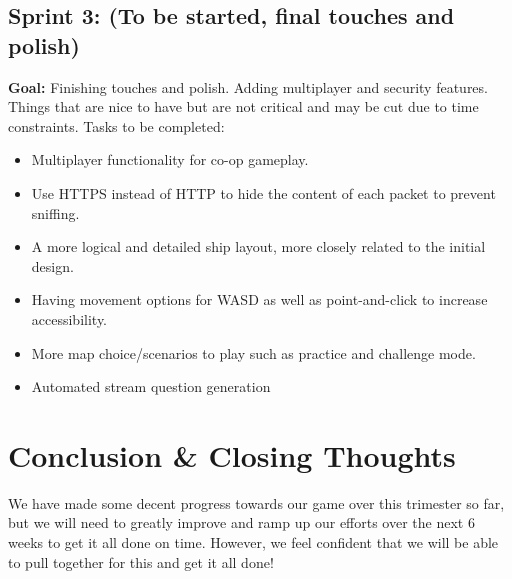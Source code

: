 \documentclass{article}
\begin{document}
\subsection*{Sprint 3: (To be started, final touches and polish)}
\textbf{Goal:} Finishing touches and polish. Adding  multiplayer and security features. Things that are nice to have but are not critical and may be cut due to time constraints.
\newline\newline
Tasks to be completed:
\begin{itemize}
    \item Multiplayer functionality for co-op gameplay.
    \item Use HTTPS instead of HTTP to hide the content of each packet to prevent sniffing.
    \item A more logical and detailed ship layout, more closely related to the initial design.
    \item Having movement options for WASD as well as point-and-click to increase accessibility.
    \item More map choice/scenarios to play such as practice and challenge mode.
    \item Automated stream question generation
\end{itemize}


\section{Conclusion \& Closing Thoughts}
We have made some decent progress towards our game over this trimester so far, but we will need to greatly improve and ramp up our efforts over the next 6 weeks to get it all done on time. However, we feel confident that we will be able to pull together for this and get it all done!
\end{document}
